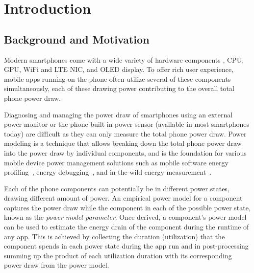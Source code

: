 \section{Introduction}
\label{sec:motivation}

\subsection{Background and Motivation}
\label{subsec:back}




Modern smartphones come with a wide variety of hardware components
, \eg CPU, GPU, WiFi and LTE NIC, and OLED display. To offer rich 
user experience, mobile apps running on the phone often utilize 
several of these components simultaneously, each of these 
drawing power contributing  to the overall total phone power draw.

Diagnosing and managing the power draw of smartphones using  an external power monitor or the phone 
built-in power sensor  (available in most smartphones today)
are difficult as they can only measure the total phone power draw.
Power modeling is a technique that allows breaking down the 
total phone power draw into the power draw by individual components, 
and is the foundation for various mobile device power
management solutions such
as mobile software energy profiling~\cite{flinn:1999,shye2009into,zhang2010accurate,sesame:2011,pathak2012energy,appscope,ding2017gfxdoctor,facebookbatterymetrics}, energy debugging~\cite{ma2013edoctor,benerjee:2014}, and in-the-wild energy measurement~\cite{chen:sigm2015,androidbatterystats,androidvitals}.  

{
Each of the phone components can potentially be 
in different power states, drawing different amount of power. 
An empirical power model for a component captures the power 
draw while the component in each of the possible power state, known as  the {\em power model parameter}.
%
Once derived, a component’s power model can be used to estimate 
the energy drain of the component during the runtime of any app. 
This is achieved by collecting the duration (utilization) that 
the component spends in each power state during the app run
and in post-processing summing up the product of 
each utilization duration with its corresponding power draw from the power model.
}

